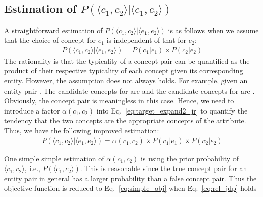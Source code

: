 \subsection{Estimation of $P(\langle c_1,c_2\rangle | \langle e_1,e_2\rangle)$ }
A straightforward estimation of $P( \langle c_{1},c_{2} \rangle | \langle e_{1},e_{2} \rangle )$ is as follows when we assume that the choice of concept for $e_1$ is independent of that for $e_2$:
\begin{equation}
\label{eq:target_expand2_naive}
\begin{split}
P(\langle c_{1},c_{2}\rangle |\langle e_{1},e_{2} \rangle) = P(c_1|e_1) \times P(c_2|e_2)
\end{split}
\end{equation} The rationality is that the typicality of a concept pair can be quantified as the product of their respective typicality of each concept given its corresponding entity.
However, the assumption does not always holds. For example, given an entity pair . The candidate concepts for  are  and the candidate concepts for  are . Obviously, the concept pair  is meaningless in this case. Hence, we need to introduce a factor $\alpha(c_1,c_2)$ into Eq.~\ref{eq:target_expand2_jr} to quantify the tendency that the two concepts are the appropriate concepts of the attribute. Thus, we have the following improved estimation:
\begin{equation}
\label{eq:target_expand2_jr}
\begin{split}
P(\langle c_{1},c_{2}\rangle |\langle e_{1},e_{2} \rangle) = \alpha(c_1,c_2) \times P(c_1|e_1) \times P(c_2|e_2)
\end{split}
\end{equation}


One simple simple estimation of $\alpha(c_1,c_2)$ is using the prior probability of $\langle c_1, c_2\rangle$, i.e., $P(\langle c_1,c_2\rangle)$. This is reasonable since the true concept pair for an entity pair in general has a larger probability than
a false concept pair.
Thus the objective function is reduced to Eq.~\ref{eq:simple_obj} when Eq.~\ref{eq:rel_jdp} holds




